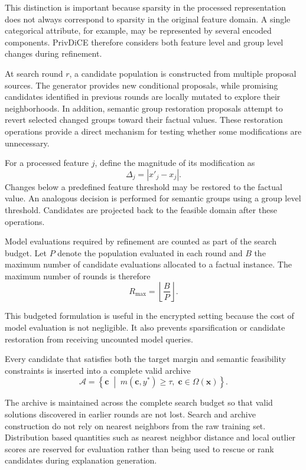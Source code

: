 \documentclass[preprint,12pt]{elsarticle}
\begin{document}
This distinction is important because sparsity in the processed representation
does not always correspond to sparsity in the original feature domain. A
single categorical attribute, for example, may be represented by several
encoded components. PrivDiCE therefore considers both feature level and group
level changes during refinement.

At search round $r$, a candidate population is constructed from multiple
proposal sources. The generator provides new conditional proposals, while
promising candidates identified in previous rounds are locally mutated to
explore their neighborhoods. In addition, semantic group restoration proposals
attempt to revert selected changed groups toward their factual values. These
restoration operations provide a direct mechanism for testing whether some
modifications are unnecessary.

For a processed feature $j$, define the magnitude of its modification as
\begin{equation}
\Delta_j =
|x'_j-x_j|.
\end{equation}
Changes below a predefined feature threshold may be restored to the factual
value. An analogous decision is performed for semantic groups using a group
level threshold. Candidates are projected back to the feasible domain after
these operations.

Model evaluations required by refinement are counted as part of the search
budget. Let $P$ denote the population evaluated in each round and $B$ the
maximum number of candidate evaluations allocated to a factual instance. The
maximum number of rounds is therefore
\begin{equation}
R_{\max} =
\left\lfloor
\frac{B}{P}
\right\rfloor.
\label{eq:search_rounds}
\end{equation}

This budgeted formulation is useful in the encrypted setting because the cost
of model evaluation is not negligible. It also prevents sparsification or
candidate restoration from receiving uncounted model queries.

Every candidate that satisfies both the target margin and semantic feasibility
constraints is inserted into a complete valid archive
\begin{equation}
\mathcal{A}
=
\left\{
\mathbf{c} \; \middle| \;
m(\mathbf{c},y^{*})\geq\tau,
\;
\mathbf{c}\in\Omega(\mathbf{x})
\right\}.
\label{eq:valid_archive}
\end{equation}

The archive is maintained across the complete search budget so that valid
solutions discovered in earlier rounds are not lost. Search and archive
construction do not rely on nearest neighbors from the raw training set.
Distribution based quantities such as nearest neighbor distance and local
outlier scores are reserved for evaluation rather than being used to rescue or
rank candidates during explanation generation.
\end{document}
